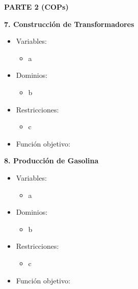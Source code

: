 \documentclass[12pt]{article}
\begin{document}
\newpage

\begin{center}
\large
\textbf{PARTE 2 (COPs)}
\end{center}

\begin{flushleft}
\textbf{7. Construcción de Transformadores}
\end{flushleft}

\begin{itemize}
\item Variables:
\begin{itemize}
\item a
\end{itemize}
\item Dominios:
\begin{itemize}
\item b
\end{itemize}
\item Restricciones:
\begin{itemize}
\item c
\end{itemize}
\item Función objetivo:
\end{itemize}

\newpage

\begin{flushleft}
\textbf{8. Producción de Gasolina}
\end{flushleft}

\begin{itemize}
\item Variables:
\begin{itemize}
\item a
\end{itemize}
\item Dominios:
\begin{itemize}
\item b
\end{itemize}
\item Restricciones:
\begin{itemize}
\item c
\end{itemize}
\item Función objetivo:
\end{itemize}
\end{document}
